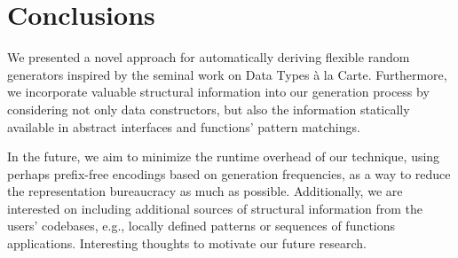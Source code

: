 \section{Conclusions}
\label{sec:conclusions}

We presented a novel approach for automatically deriving flexible random
generators inspired by the seminal work on Data Types \`a la Carte.
%
Furthermore, we incorporate valuable structural information into our generation
process by considering not only data constructors, but also the information
statically available in abstract interfaces and functions' pattern matchings.


In the future, we aim to minimize the runtime overhead of our technique, using
perhaps prefix-free encodings based on generation frequencies, as a way to
reduce the representation bureaucracy as much as possible.
%
Additionally, we are interested on including additional sources of structural
information from the users' codebases, e.g., locally defined patterns or
sequences of functions applications.
%
Interesting thoughts to motivate our future research.
